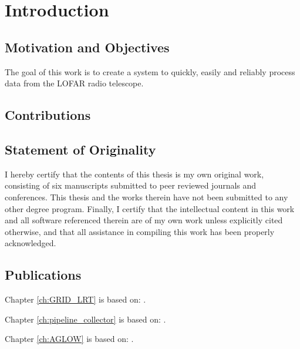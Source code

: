 \chapter{Introduction}

\section{Motivation and Objectives}

The goal of this work is to create a system to quickly, easily and reliably process data from the LOFAR radio telescope. 




\section{Contributions}




\section{Statement of Originality}

I hereby certify that the contents of this thesis is my own original work, consisting of six manuscripts submitted to peer reviewed journals and conferences. This thesis and the works therein have not been submitted to any other degree program. Finally, I certify that the intellectual content in this work and all software referenced therein are of my own work unless explicitly cited otherwise, and that all assistance in compiling this work has been properly acknowledged.

\section{Publications}


Chapter \ref{ch:GRID_LRT} is based on:  .

Chapter \ref{ch:pipeline_collector} is based on: .

Chapter \ref{ch:AGLOW} is based on: .

